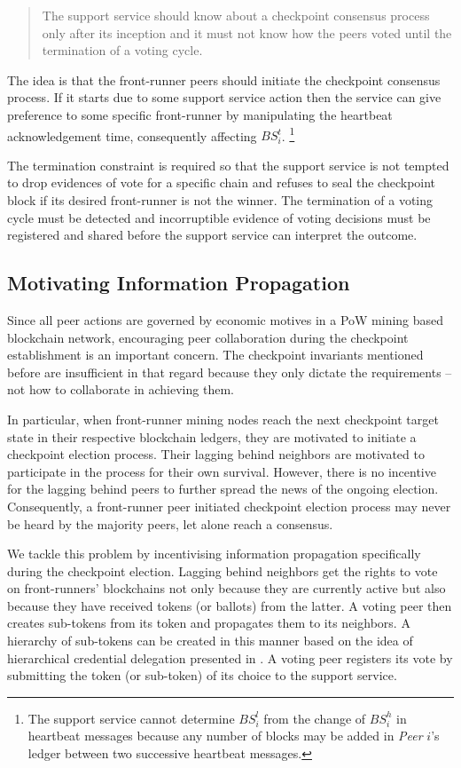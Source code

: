 \begin{quote}
The support service should know about a checkpoint consensus process only after its inception and it must not know how the peers voted until the termination of a voting cycle.         
\end{quote}

The idea is that the front-runner peers should initiate the checkpoint consensus process. If it starts due to some support service action then the service can give preference to some specific front-runner by manipulating the heartbeat acknowledgement time, consequently affecting $BS_i^t$. \footnote{The support service cannot determine $BS_i^l$ from the change of $BS_i^h$ in heartbeat messages because any number of blocks may be added in \textit{Peer} $i$'s ledger between two successive heartbeat messages.}

The termination constraint is required so that the support service is not tempted to drop evidences of vote for a specific chain and refuses to seal the checkpoint block if its desired front-runner is not the winner. The termination of a voting cycle must be detected and incorruptible evidence of voting decisions must be registered and shared before the support service can interpret the outcome.                          

\subsection{Motivating Information Propagation}
\label{info-propagate}
Since all peer actions are governed by economic motives in a PoW mining based blockchain network, encouraging peer collaboration during the checkpoint establishment is an important concern. The checkpoint invariants mentioned before are insufficient in that regard because they only dictate the requirements -- not how to collaborate in achieving them.

In particular, when front-runner mining nodes reach the next checkpoint target state in their respective blockchain ledgers, they are motivated to initiate a checkpoint election process. Their lagging behind neighbors are motivated to participate in the process for their own survival. However, there is no incentive for the lagging behind peers to further spread the news of the ongoing election. Consequently, a front-runner peer initiated checkpoint election process may never be heard by the majority peers, let alone reach a consensus.   

We tackle this problem by incentivising information propagation specifically during the checkpoint election. Lagging behind neighbors get the rights to vote on front-runners' blockchains not only because they are currently active but also because they have received tokens (or ballots) from the latter. A voting peer then creates sub-tokens from its token and propagates them to its neighbors. A hierarchy of sub-tokens can be created in this manner based on the idea of hierarchical credential delegation presented in \cite{Ding1996}. A voting peer registers its vote by submitting the token (or sub-token) of its choice to the support service.

